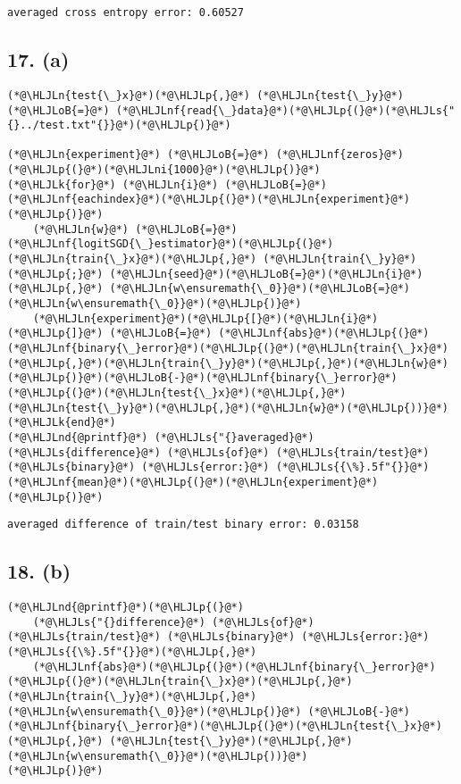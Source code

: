\documentclass[12pt,a4paper]{article}
\newcommand{\HLJLk}[1]{\textcolor[RGB]{148,91,176}{\textbf{#1}}}
\newcommand{\HLJLn}[1]{#1}
\newcommand{\HLJLnd}[1]{\textcolor[RGB]{214,102,97}{#1}}
\newcommand{\HLJLnf}[1]{\textcolor[RGB]{66,102,213}{#1}}
\newcommand{\HLJLs}[1]{\textcolor[RGB]{201,61,57}{#1}}
\newcommand{\HLJLni}[1]{\textcolor[RGB]{59,151,46}{#1}}
\newcommand{\HLJLoB}[1]{\textcolor[RGB]{102,102,102}{\textbf{#1}}}
\newcommand{\HLJLp}[1]{#1}
\begin{document}
\begin{lstlisting}
averaged cross entropy error: 0.60527
\end{lstlisting}


\subsection{17. (a)}

\begin{lstlisting}
(*@\HLJLn{test{\_}x}@*)(*@\HLJLp{,}@*) (*@\HLJLn{test{\_}y}@*) (*@\HLJLoB{=}@*) (*@\HLJLnf{read{\_}data}@*)(*@\HLJLp{(}@*)(*@\HLJLs{"{}../test.txt"{}}@*)(*@\HLJLp{)}@*)

(*@\HLJLn{experiment}@*) (*@\HLJLoB{=}@*) (*@\HLJLnf{zeros}@*)(*@\HLJLp{(}@*)(*@\HLJLni{1000}@*)(*@\HLJLp{)}@*)
(*@\HLJLk{for}@*) (*@\HLJLn{i}@*) (*@\HLJLoB{=}@*) (*@\HLJLnf{eachindex}@*)(*@\HLJLp{(}@*)(*@\HLJLn{experiment}@*)(*@\HLJLp{)}@*)
    (*@\HLJLn{w}@*) (*@\HLJLoB{=}@*) (*@\HLJLnf{logitSGD{\_}estimator}@*)(*@\HLJLp{(}@*)(*@\HLJLn{train{\_}x}@*)(*@\HLJLp{,}@*) (*@\HLJLn{train{\_}y}@*)(*@\HLJLp{;}@*) (*@\HLJLn{seed}@*)(*@\HLJLoB{=}@*)(*@\HLJLn{i}@*)(*@\HLJLp{,}@*) (*@\HLJLn{w\ensuremath{\_0}}@*)(*@\HLJLoB{=}@*)(*@\HLJLn{w\ensuremath{\_0}}@*)(*@\HLJLp{)}@*)
    (*@\HLJLn{experiment}@*)(*@\HLJLp{[}@*)(*@\HLJLn{i}@*)(*@\HLJLp{]}@*) (*@\HLJLoB{=}@*) (*@\HLJLnf{abs}@*)(*@\HLJLp{(}@*)(*@\HLJLnf{binary{\_}error}@*)(*@\HLJLp{(}@*)(*@\HLJLn{train{\_}x}@*)(*@\HLJLp{,}@*)(*@\HLJLn{train{\_}y}@*)(*@\HLJLp{,}@*)(*@\HLJLn{w}@*)(*@\HLJLp{)}@*)(*@\HLJLoB{-}@*)(*@\HLJLnf{binary{\_}error}@*)(*@\HLJLp{(}@*)(*@\HLJLn{test{\_}x}@*)(*@\HLJLp{,}@*)(*@\HLJLn{test{\_}y}@*)(*@\HLJLp{,}@*)(*@\HLJLn{w}@*)(*@\HLJLp{))}@*)
(*@\HLJLk{end}@*)
(*@\HLJLnd{@printf}@*) (*@\HLJLs{"{}averaged}@*) (*@\HLJLs{difference}@*) (*@\HLJLs{of}@*) (*@\HLJLs{train/test}@*) (*@\HLJLs{binary}@*) (*@\HLJLs{error:}@*) (*@\HLJLs{{\%}.5f"{}}@*) (*@\HLJLnf{mean}@*)(*@\HLJLp{(}@*)(*@\HLJLn{experiment}@*)(*@\HLJLp{)}@*)
\end{lstlisting}

\begin{lstlisting}
averaged difference of train/test binary error: 0.03158
\end{lstlisting}


\subsection{18. (b)}

\begin{lstlisting}
(*@\HLJLnd{@printf}@*)(*@\HLJLp{(}@*)
    (*@\HLJLs{"{}difference}@*) (*@\HLJLs{of}@*) (*@\HLJLs{train/test}@*) (*@\HLJLs{binary}@*) (*@\HLJLs{error:}@*) (*@\HLJLs{{\%}.5f"{}}@*)(*@\HLJLp{,}@*)
    (*@\HLJLnf{abs}@*)(*@\HLJLp{(}@*)(*@\HLJLnf{binary{\_}error}@*)(*@\HLJLp{(}@*)(*@\HLJLn{train{\_}x}@*)(*@\HLJLp{,}@*) (*@\HLJLn{train{\_}y}@*)(*@\HLJLp{,}@*) (*@\HLJLn{w\ensuremath{\_0}}@*)(*@\HLJLp{)}@*) (*@\HLJLoB{-}@*) (*@\HLJLnf{binary{\_}error}@*)(*@\HLJLp{(}@*)(*@\HLJLn{test{\_}x}@*)(*@\HLJLp{,}@*) (*@\HLJLn{test{\_}y}@*)(*@\HLJLp{,}@*) (*@\HLJLn{w\ensuremath{\_0}}@*)(*@\HLJLp{))}@*)
(*@\HLJLp{)}@*)
\end{lstlisting}
\end{document}

